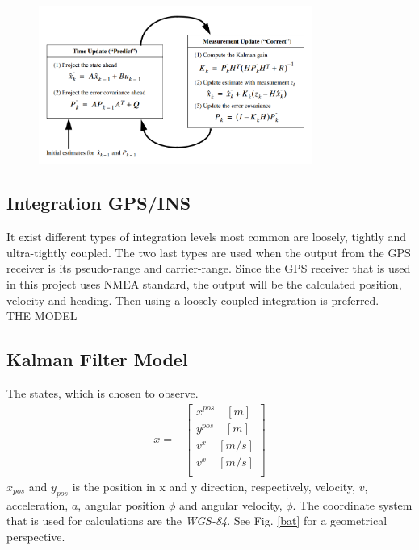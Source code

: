 \begin{figure}[H]
\centering
\includegraphics[width=0.8\textwidth]{Figures/kalman_algo.png}
\caption{}
\label{kalman}
\end{figure}

\subsection*{Integration GPS/INS}
It exist different types of integration levels most common are loosely, tightly and ultra-tightly coupled. The two last types are used when the output from the GPS receiver is its pseudo-range and carrier-range. Since the GPS receiver that is used in this project uses NMEA standard, the output will be the calculated position, velocity and heading. Then using a loosely coupled integration is preferred.\\
THE MODEL \\ 

\subsection*{Kalman Filter Model}
The states, which is chosen to observe.
\begin{align}
x=&
\begin{bmatrix}
x^{pos}\quad[m]\\
y^{pos}\quad[m]\\
v^{x}\quad[m/s]\\
v^{x}\quad[m/s]\\
\end{bmatrix}
\end{align}
$x_{pos}$ and $y_{pos}$ is the position in x and y direction, respectively, velocity, $v$, acceleration, $a$, angular position $\phi$ and angular velocity, $\dot{\phi}$. The coordinate system that is used for calculations are the \emph{WGS-84}. See Fig. \ref{bat} for a geometrical perspective.

